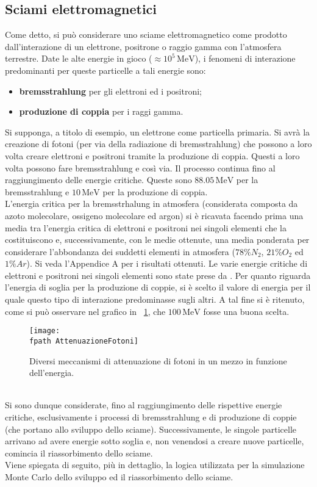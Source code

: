 \documentclass[10pt,a4paper,usenatbib]{article}
\newcommand*{\unit}[1]{\ensuremath{\mathrm{\,#1}}}                              %
\newcommand{\fpath}{./Figs/}
\begin{document}
\subsection{Sciami elettromagnetici}
Come detto, si può considerare uno sciame elettromagnetico come prodotto dall'interazione di un elettrone, positrone o raggio gamma con l'atmosfera terrestre. Date le alte energie in gioco ($\approx10^5\unit{MeV}$), i fenomeni di interazione predominanti per queste particelle a tali energie sono:
\begin{itemize}
\item \textbf{bremsstrahlung} per gli elettroni ed i positroni;
\item \textbf{produzione di coppia} per i raggi gamma.
\end{itemize}
Si supponga, a titolo di esempio, un elettrone come particella primaria. Si avrà la creazione di fotoni (per via della radiazione di bremsstrahlung) che possono a loro volta creare elettroni e positroni tramite la produzione di coppia. Questi a loro volta possono fare bremsstrahlung e così via. Il processo continua fino al raggiungimento delle energie critiche. Queste sono $88.05\unit{MeV}$ per la bremsstrahlung e $10\unit{MeV}$ per la produzione di coppia. 
\\L'energia critica per la bremsstrhalung in atmosfera (considerata composta da azoto molecolare, ossigeno molecolare ed argon) si è ricavata facendo prima una media tra l'energia critica di elettroni e positroni nei singoli elementi che la costituiscono e, successivamente, con le medie ottenute, una media ponderata per considerare l'abbondanza dei suddetti elementi in atmosfera ($78\% N_2$, $21\% O_2$ ed $1\% Ar$). Si veda l'Appendice A per i risultati ottenuti. Le varie energie critiche di elettroni e positroni nei singoli elementi sono state prese da \cite{Olive:2016xmw}. Per quanto riguarda l'energia di soglia per la produzione di coppie, si è scelto il valore di energia per il quale questo tipo di interazione predominasse sugli altri. A tal fine si è ritenuto, come si può osservare nel grafico in \figurename~\ref{\fpath jpg:AttenuazioneFotoni}, che $100\unit{MeV}$ fosse una buona scelta. 
\begin{figure} [h!]
\centering
\texttt{[image: \\fpath AttenuazioneFotoni]}
\caption{Diversi meccanismi di attenuazione di fotoni in un mezzo in funzione dell'energia. }
\label{\fpath jpg:AttenuazioneFotoni}
\end{figure}
\\Si sono dunque considerate, fino al raggiungimento delle rispettive energie critiche, esclusivamente i processi di bremsstrahlung e di produzione di coppie (che portano allo sviluppo dello sciame). Successivamente, le singole particelle arrivano ad avere energie sotto soglia e, non venendosi a creare nuove particelle, comincia il riassorbimento dello sciame. 
\\Viene spiegata di seguito, più in dettaglio, la logica utilizzata per la simulazione Monte Carlo dello sviluppo ed il riassorbimento dello sciame. 
\end{document}
